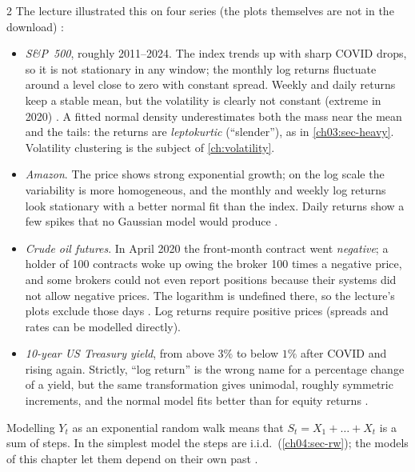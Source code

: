 \begin{paracol}{2}
The lecture illustrated this on four series (the plots themselves are not in the download)
:
\begin{itemize}
  \item \emph{S\&P~500}, roughly 2011--2024. The index trends up with sharp COVID drops, so it is not
        stationary in any window; the monthly log returns fluctuate around a level close to zero with
        constant spread. Weekly and daily returns keep a stable mean, but the volatility is clearly not
        constant (extreme in 2020) . A fitted normal density
        underestimates both the mass near the mean and the tails: the returns are
        \emph{leptokurtic} (``slender''), as in \cref{ch03:sec-heavy}. Volatility clustering is the subject of
        \cref{ch:volatility}.
  \item \emph{Amazon}. The price shows strong exponential growth; on the log scale the variability is more
        homogeneous, and the monthly and weekly log returns look stationary with a better normal fit than the
        index. Daily returns show a few spikes that no Gaussian model would produce
        .
  \item \emph{Crude oil futures}. In April 2020 the front-month contract went \emph{negative}; a holder of
        100 contracts woke up owing the broker 100 times a negative price, and some brokers could not
        even report positions because their systems did not allow negative prices. The logarithm is
        undefined there, so the lecture's plots exclude those days .
        Log returns require positive prices (spreads and rates can be modelled directly).
  \item \emph{10-year US Treasury yield}, from above $3\%$ to below $1\%$ after COVID and rising again.
        Strictly, ``log return'' is the wrong name for a percentage change of a yield, but the same
        transformation gives unimodal, roughly symmetric increments, and the normal model fits better than
        for equity returns .
\end{itemize}
Modelling $Y_t$ as an exponential random walk means that $S_t=X_1+\dots+X_t$ is a sum of steps. In the
simplest model the steps are i.i.d.\ (\cref{ch04:sec-rw}); the models of this chapter let them depend
on their own past .


\end{paracol}
